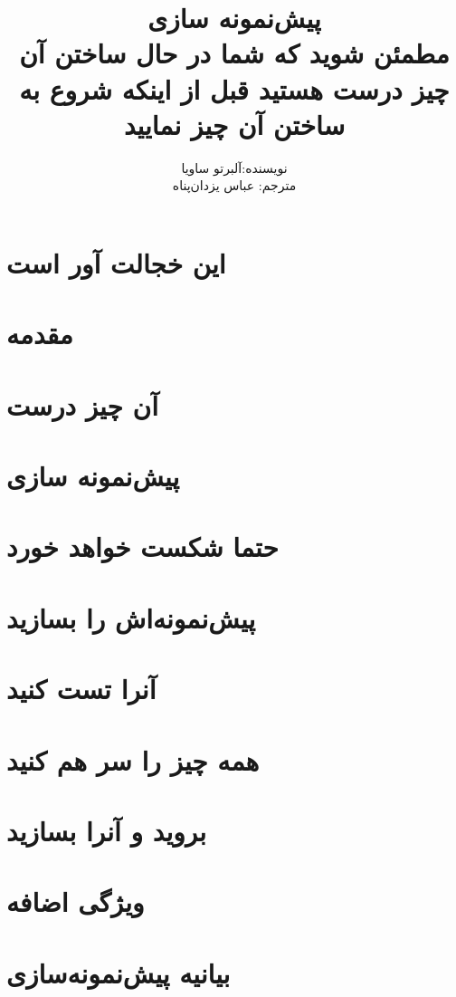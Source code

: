 \documentclass[a5paper,14pt]{book}
\author{نویسنده:آلبرتو ساویا
\\ مترجم: عباس یزدان‌پناه}
\title{پیش‌نمونه سازی
\\
مطمئن شوید که شما در حال ساختن  آن چیز درست هستید قبل از اینکه شروع به ساختن آن چیز نمایید}
\begin{document}
\maketitle
\frontmatter
\tableofcontents

\chapter{این خجالت آور است}

\chapter{مقدمه}

\mainmatter
\chapter{آن چیز درست}

\chapter{پیش‌نمونه سازی}

\chapter{حتما شکست خواهد خورد}

\chapter{پیش‌نمونه‌اش را بسازید}

\chapter{‌آنرا تست کنید}

\chapter{همه چیز را سر هم کنید}

\chapter{بروید و آنرا بسازید}

\chapter{ویژگی اضافه}

\chapter*{بیانیه پیش‌نمونه‌سازی}

\end{document}
